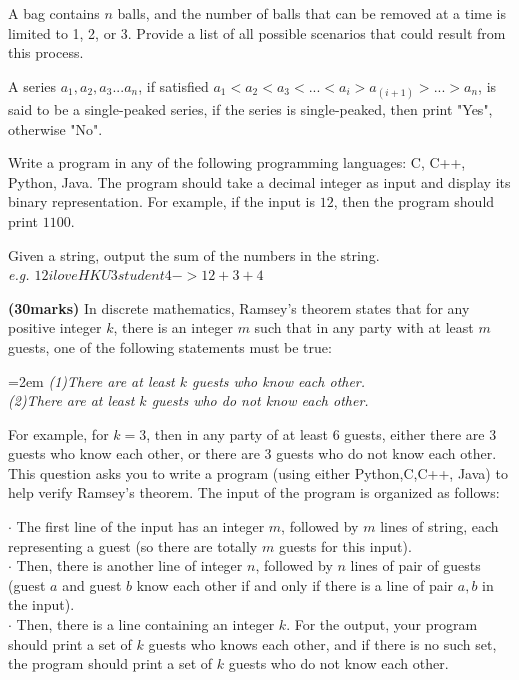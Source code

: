 \documentclass{article}
\begin{document}
\vspace{2\baselineskip}

\noindent A bag contains $n$ balls, and the number of balls that can be removed at a time is limited to 1, 2, or 3. Provide a list of all possible scenarios that could result from this process.

\vspace{2\baselineskip}

\noindent A series $a_1, a_2, a_3...a_n$, if satisfied $a_1 < a_2 <a_3 <...< a_i > a_(i+1) > ... > a_n$, is said to be a single-peaked series, if the series is single-peaked, then print "Yes", otherwise "No".

\vspace{2\baselineskip}

\noindent Write a program in any of the following programming languages: C, C++, Python, Java. The program should take a decimal integer as input and display its binary representation. For example, if the input is $12$, then the program should print $1100$.

\vspace{2\baselineskip}

\noindent Given a string, output the sum of the numbers in the string.\\
\textit{\fontsize{9pt}{12pt}\selectfont e.g. $12iloveHKU3student4 -> 12+3+4$}

\vspace{2\baselineskip}

\noindent \textbf{(30marks)} In discrete mathematics, Ramsey's theorem states that for any positive integer $k$, there is an integer $m$ such that in any party with at least $m$ guests, one of the following statements must be true:

\hangindent=2em %
\textit{(1)There are at least $k$ guests who know each other.}\\
\textit{(2)There are at least $k$ guests who do not know each other.}

For example, for $k=3$, then in any party of at least 6 guests, either there are 3 guests who know each other, or there are 3 guests who do not know each other. This question asks you to write a program (using either Python,C,C++, Java) to help verify Ramsey's theorem. The input of the program is organized as follows:


\indent $\cdot$ The first line of the input has an integer $m$, followed by $m$ lines of string, each representing a guest (so there are totally $m$ guests for this input).\\
\indent $\cdot$ Then, there is another line of integer $n$, followed by $n$ lines of pair of guests (guest $a$ and guest $b$ know each other if and only if there is a line of pair $a, b$ in the input).\\
\indent $\cdot$ Then, there is a line containing an integer $k$.
For the output, your program should print a set of $k$ guests who knows each other, and if there is no such set, the program should print a set of $k$ guests who do not know each other.\\
\end{document}
